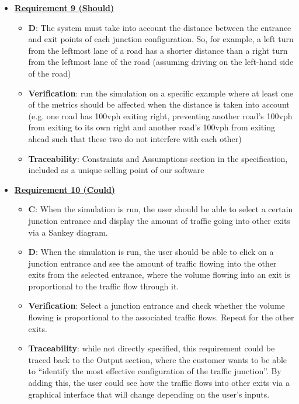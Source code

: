 \documentclass{article}
\begin{document}
\begin{itemize}
    \item \textbf{\underline{Requirement 9 (Should)}}
    \begin{itemize}
        \item \textbf{D}: The system must take into account the distance between the entrance and exit 
            points of each junction configuration. So, for example, a left turn from the 
            leftmost lane of a road has a shorter distance than a right turn from the leftmost 
            lane of the road (assuming driving on the left-hand side of the road)
        \item \textbf{Verification}: run the simulation on a specific example where at least one of 
            the metrics should be affected when the distance is taken into account (e.g. one 
            road has 100vph exiting right, preventing another road’s 100vph from exiting to its
            own right and another road’s 100vph from exiting ahead such that these two do not 
            interfere with each other)
        \item\textbf{Traceability}: Constraints and Assumptions section in the specification, included 
            as a unique selling point of our software
    \end{itemize}

    \item \textbf{\underline{Requirement 10 (Could)}}
    \begin{itemize}
        \item \textbf{C}: When the simulation is run, the user should be able to select a certain junction entrance 
            and display the amount of traffic going into other exits via a 
            Sankey diagram.
        \item \textbf{D}: When the simulation is run, the user should be able to click on a junction entrance and see 
            the amount of traffic flowing into the other exits from the selected entrance, where the volume 
            flowing into an exit is proportional to the traffic flow through it.
        \item \textbf{Verification}: Select a junction entrance and check whether the volume flowing
            is proportional to the associated traffic flows. Repeat for the other exits.
        \item\textbf{Traceability}: while not directly specified, this requirement could be traced back 
            to the Output section, where the customer wants to be able to “identify the most effective 
            configuration of the traffic junction”. By adding this, the user could see how the traffic 
            flows into other exits via a graphical interface that will change depending on the user's 
            inputs.
    \end{itemize}


\end{itemize}
\end{document}
